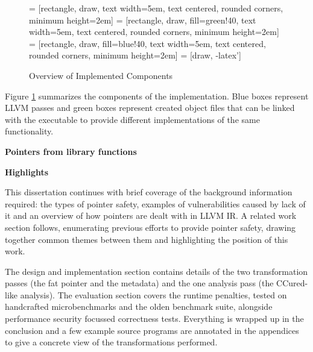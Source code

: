 \documentclass[a4paper,12pt,twoside,openright]{report}
\begin{document}
\begin{figure}
\centering
{} = [rectangle, draw, 
text width=5em, text centered, rounded corners, minimum height=2em]
 = [rectangle, draw, fill=green!40, 
text width=5em, text centered, rounded corners, minimum height=2em]
 = [rectangle, draw, fill=blue!40, 
text width=5em, text centered, rounded corners, minimum height=2em]
 = [draw, -latex']
\caption{Overview of Implemented Components}
\label{fig:Components}
\end{figure}

Figure \ref{fig:Components} summarizes the components of the implementation.
Blue boxes represent LLVM passes and green boxes represent created object files that can be linked with the executable to provide different implementations of the same functionality.

\textbf{Pointers from library functions}

\textbf{Highlights}

This dissertation continues with brief coverage of the background information required: the types of pointer safety, examples of vulnerabilities caused by lack of it and an overview of how pointers are dealt with in LLVM IR.
A related work section follows, enumerating previous efforts to provide pointer safety, drawing together common themes between them and highlighting the position of this work.

The design and implementation section contains details of the two transformation passes (the fat pointer and the metadata) and the one analysis pass (the CCured-like analysis).
The evaluation section covers the runtime penalties, tested on handcrafted microbenchmarks and the olden benchmark suite, alongside performance security focussed correctness tests.
Everything is wrapped up in the conclusion and a few example source programs are annotated in the appendices to give a concrete view of the transformations performed.
\end{document}
